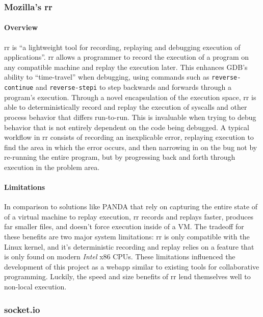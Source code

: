 \documentclass[12pt]{article}
\begin{document}
\subsubsection{Mozilla's rr}\label{rr}

\paragraph{Overview}

rr is ``a lightweight tool for recording, replaying and debugging
execution of applications''.\cite{rr-repo} rr allows a programmer to
record the execution of a program on any compatible machine and replay
the execution later.  This enhances GDB's ability to ``time-travel''
when debugging, using commands such as \lstinline{reverse-continue}
and \lstinline{reverse-stepi}\cite{gdbman} to step backwards and
forwards through a program's execution.  Through a novel encapsulation
of the execution space, rr is able to deterministically record and
replay the execution of syscalls and other process behavior that
differs run-to-run.  This is invaluable when trying to debug behavior
that is not entirely dependent on the code being debugged.  A typical
workflow in rr consists of recording an inexplicable error, replaying
execution to find the area in which the error occurs, and then
narrowing in on the bug not by re-running the entire program, but by
progressing back and forth through execution in the problem area.

\paragraph{Limitations}

In comparison to solutions like PANDA\cite{10.1145/2843859.2843867}
that rely on capturing the entire state of of a virtual machine to
replay execution, rr records and replays faster, produces far smaller
files, and doesn't force execution inside of a
VM.\cite{DBLP:journals/corr/OCallahanJFHNP17} The tradeoff for these
benefits are two major system limitations: rr is only compatible with
the Linux kernel, and it's deterministic recording and replay relies
on a feature that is only found on modern \textit{Intel} x86 CPUs.
These limitations influenced the development of this project as a
webapp similar to existing tools for collaborative programming.
Luckily, the speed and size benefits of rr lend themselves well to
non-local execution.

\subsubsection{socket.io}\label{socketio}
\end{document}
